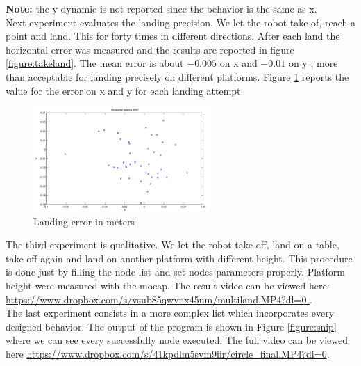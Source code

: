 \noindent
\textbf{Note:} the y dynamic is not reported since the behavior is the same as x. \\

\noindent
Next experiment evaluates the landing precision. We let the robot take of, reach a point and land. This for forty times in different directions. After each land the horizontal error was measured and the results are reported in figure \ref{figure:takeland}. The mean error is about $-0.005$ on x and $-0.01$ on y , more than acceptable for landing precisely on different platforms. Figure \ref{figure:landerr} reports the value for the error on x and y for each landing attempt.

\begin{figure}[h]
\centering
 \includegraphics[width=0.6\textwidth]{landing.png}
 \caption{Landing error in meters}
 \label{figure:landerr}
\end{figure}


The third experiment is qualitative. We let the robot take off, land on a table, take off again and land on another platform with different height. This procedure is done just by filling the node list and set nodes parameters properly. Platform height were measured with the mocap. The result video can be viewed here: \url{https://www.dropbox.com/s/vsub85qwvnx45um/multiland.MP4?dl=0 }. \\

\noindent
The last experiment consists in a more complex list which incorporates every designed behavior. The output of the program is shown in Figure \ref{figure:snip} where we can see every successfully node executed. The full video can be viewed here \url{https://www.dropbox.com/s/41kpdlm5svm9iir/circle_final.MP4?dl=0}. 

